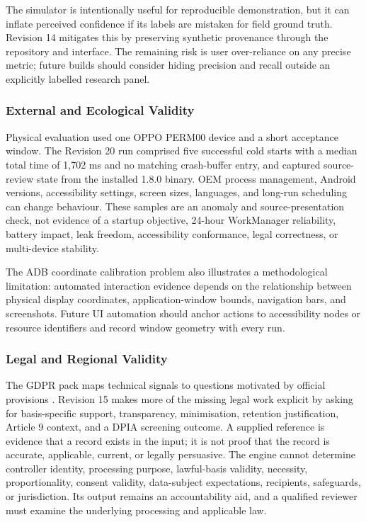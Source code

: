 The simulator is intentionally useful for reproducible demonstration, but it can inflate perceived confidence if its labels are mistaken for field ground truth. Revision 14 mitigates this by preserving synthetic provenance through the repository and interface. The remaining risk is user over-reliance on any precise metric; future builds should consider hiding precision and recall outside an explicitly labelled research panel.

\subsubsection{External and Ecological Validity}

Physical evaluation used one OPPO PERM00 device and a short acceptance window. The Revision 20 run comprised five successful cold starts with a median total time of 1,702 ms and no matching crash-buffer entry, and captured source-review state from the installed 1.8.0 binary. OEM process management, Android versions, accessibility settings, screen sizes, languages, and long-run scheduling can change behaviour. These samples are an anomaly and source-presentation check, not evidence of a startup objective, 24-hour WorkManager reliability, battery impact, leak freedom, accessibility conformance, legal correctness, or multi-device stability.

The ADB coordinate calibration problem also illustrates a methodological limitation: automated interaction evidence depends on the relationship between physical display coordinates, application-window bounds, navigation bars, and screenshots. Future UI automation should anchor actions to accessibility nodes or resource identifiers and record window geometry with every run.

\subsubsection{Legal and Regional Validity}

The GDPR pack maps technical signals to questions motivated by official provisions \cite{eurlex2016}. Revision 15 makes more of the missing legal work explicit by asking for basis-specific support, transparency, minimisation, retention justification, Article 9 context, and a DPIA screening outcome. A supplied reference is evidence that a record exists in the input; it is not proof that the record is accurate, applicable, current, or legally persuasive. The engine cannot determine controller identity, processing purpose, lawful-basis validity, necessity, proportionality, consent validity, data-subject expectations, recipients, safeguards, or jurisdiction. Its output remains an accountability aid, and a qualified reviewer must examine the underlying processing and applicable law.

